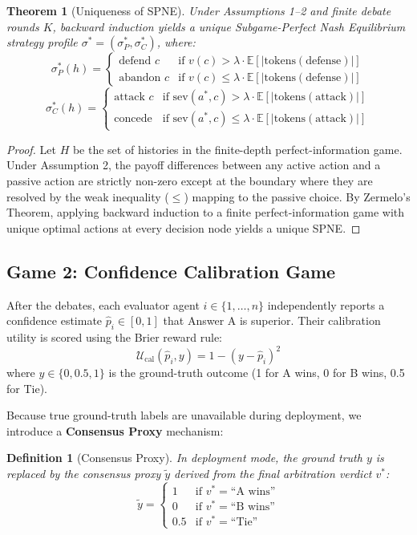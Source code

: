 \documentclass[11pt,a4paper]{article}
\newtheorem{theorem}{Theorem}
\newtheorem{definition}{Definition}
\begin{document}
\begin{theorem}[Uniqueness of SPNE]
Under Assumptions 1--2 and finite debate rounds $K$, backward induction yields a unique Subgame-Perfect Nash Equilibrium strategy profile $\sigma^* = (\sigma_P^*, \sigma_C^*)$, where:
$$\sigma_P^*(h) = \begin{cases}
\text{defend } c & \text{if } v(c) > \lambda \cdot \mathbb{E}[|\text{tokens}(\text{defense})|] \\
\text{abandon } c & \text{if } v(c) \leq \lambda \cdot \mathbb{E}[|\text{tokens}(\text{defense})|]
\end{cases}$$
$$\sigma_C^*(h) = \begin{cases}
\text{attack } c & \text{if } \text{sev}(a^*, c) > \lambda \cdot \mathbb{E}[|\text{tokens}(\text{attack})|] \\
\text{concede} & \text{if } \text{sev}(a^*, c) \leq \lambda \cdot \mathbb{E}[|\text{tokens}(\text{attack})|]
\end{cases}$$
\end{theorem}
\begin{proof}
Let $H$ be the set of histories in the finite-depth perfect-information game. Under Assumption 2, the payoff differences between any active action and a passive action are strictly non-zero except at the boundary where they are resolved by the weak inequality ($\leq$) mapping to the passive choice. By Zermelo's Theorem, applying backward induction to a finite perfect-information game with unique optimal actions at every decision node yields a unique SPNE.
\end{proof}

\subsection{Game 2: Confidence Calibration Game}
After the debates, each evaluator agent $i \in \{1, \dots, n\}$ independently reports a confidence estimate $\hat{p}_i \in [0, 1]$ that Answer A is superior. Their calibration utility is scored using the Brier reward rule:
$$\mathcal{U}_{\text{cal}}(\hat{p}_i, y) = 1 - (y - \hat{p}_i)^2$$
where $y \in \{0, 0.5, 1\}$ is the ground-truth outcome (1 for A wins, 0 for B wins, 0.5 for Tie).

Because true ground-truth labels are unavailable during deployment, we introduce a \textbf{Consensus Proxy} mechanism:
\begin{definition}[Consensus Proxy]
In deployment mode, the ground truth $y$ is replaced by the consensus proxy $\tilde{y}$ derived from the final arbitration verdict $v^*$:
$$\tilde{y} = \begin{cases}
1 & \text{if } v^* = \text{``A wins''} \\
0 & \text{if } v^* = \text{``B wins''} \\
0.5 & \text{if } v^* = \text{``Tie''}
\end{cases}$$
\end{definition}
\end{document}

